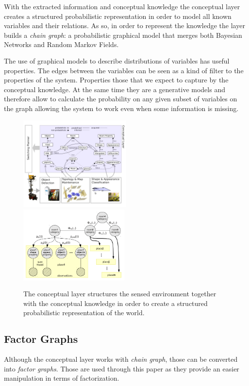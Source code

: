 \documentclass[runningheads,a4paper]{llncs}
\begin{document}
With the extracted information and conceptual knowledge the conceptual layer creates a structured probabilistic representation
in order to model all known variables and their relations.
As so, in order to represent the knowledge the layer builds a \emph{chain graph}:
a probabilistic graphical model that merges both Bayesian Networks and Random Markov Fields.

The use of graphical models to describe distributions of variables has useful properties.
The edges between the variables can be seen as a kind of filter to the properties of the system.
Properties those that we expect to capture by the conceptual knowledge.
At the same time they are a generative models and therefore allow to calculate the probability
on any given subset of variables on the graph allowing the system to work even when some
information is missing.


\begin{figure}[h]
\centering

\includegraphics[width=0.50\textwidth]{figures/conceptual-layer.jpg}
\includegraphics[width=0.49\textwidth]{figures/chain-graph.png}
\caption{The conceptual layer structures the sensed environment together with the conceptual knowledge
         in order to create a structured probabilistic representation of the world.}
\end{figure}

\subsection{Factor Graphs}
Although the conceptual layer works with \emph{chain graph}, those can be converted into \emph{factor graphs}.
Those are used through this paper as they provide an easier manipulation in terms of factorization.
\end{document}
